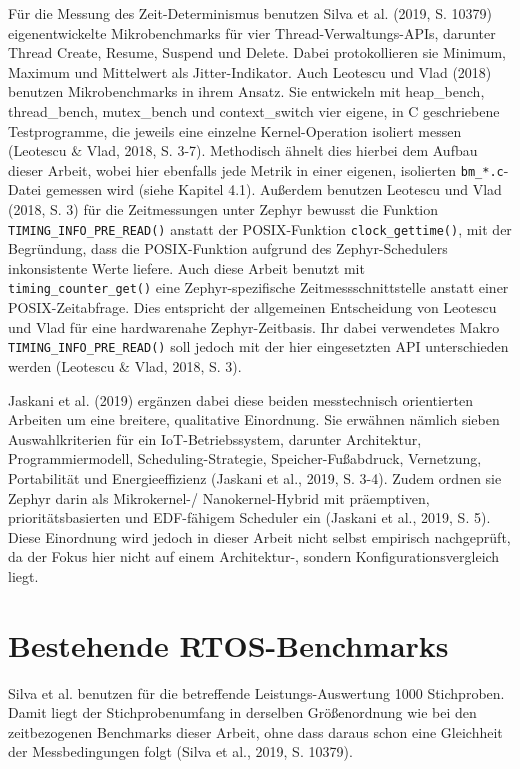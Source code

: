 F{\"u}r die Messung des Zeit-Determinismus benutzen Silva et al. (2019, S. 10379) eigenentwickelte Mikrobenchmarks f{\"u}r vier Thread-Verwaltungs-APIs, darunter \glqq{}Thread Create\grqq{}, \glqq{}Resume\grqq{}, \glqq{}Suspend\grqq{} und \glqq{}Delete\grqq{}. Dabei protokollieren sie Minimum, Maximum und Mittelwert als Jitter-Indikator. Auch Leotescu und Vlad (2018) benutzen Mikrobenchmarks in ihrem Ansatz. Sie entwickeln mit \glqq{}heap\_bench\grqq{}, \glqq{}thread\_bench\grqq{}, \glqq{}mutex\_bench\grqq{} und \glqq{}context\_switch\grqq{} vier eigene, in C geschriebene Testprogramme, die jeweils eine einzelne Kernel-Operation isoliert messen (Leotescu \& Vlad, 2018, S. 3-7). Methodisch {\"a}hnelt dies hierbei dem Aufbau dieser Arbeit, wobei hier ebenfalls jede Metrik in einer eigenen, isolierten \lstinline[style=fileinline]|bm_*.c|-Datei gemessen wird (siehe Kapitel 4.1). Au{\ss}erdem benutzen Leotescu und Vlad (2018, S. 3) f{\"u}r die Zeitmessungen unter Zephyr bewusst die Funktion \lstinline[style=fileinline]|TIMING_INFO_PRE_READ()| anstatt der POSIX-Funktion \lstinline[style=fileinline]|clock_gettime()|, mit der Begr{\"u}ndung, dass die POSIX-Funktion aufgrund des Zephyr-Schedulers inkonsistente Werte liefere. Auch diese Arbeit benutzt mit \lstinline[style=fileinline]|timing_counter_get()| eine Zephyr-spezifische Zeitmessschnittstelle anstatt einer POSIX-Zeitabfrage. Dies entspricht der allgemeinen Entscheidung von Leotescu und Vlad f{\"u}r eine hardwarenahe Zephyr-Zeitbasis. Ihr dabei verwendetes Makro \lstinline[style=fileinline]|TIMING_INFO_PRE_READ()| soll jedoch mit der hier eingesetzten API unterschieden werden (Leotescu \& Vlad, 2018, S. 3).

Jaskani et al. (2019) erg{\"a}nzen dabei diese beiden messtechnisch orientierten Arbeiten um eine breitere, qualitative Einordnung. Sie erw{\"a}hnen n{\"a}mlich sieben Auswahlkriterien f{\"u}r ein IoT-Betriebssystem, darunter Architektur, Programmiermodell, Scheduling-Strategie, Speicher-Fu{\ss}abdruck, Vernetzung, Portabilit{\"a}t und Energieeffizienz (Jaskani et al., 2019, S. 3-4). Zudem ordnen sie Zephyr darin als Mikrokernel-/ Nanokernel-Hybrid mit pr{\"a}emptiven, priorit{\"a}tsbasierten und EDF-f{\"a}higem Scheduler ein (Jaskani et al., 2019, S. 5). Diese Einordnung wird jedoch in dieser Arbeit nicht selbst empirisch nachgepr{\"u}ft, da der Fokus hier nicht auf einem Architektur-, sondern Konfigurationsvergleich liegt.

\section{Bestehende RTOS-Benchmarks}
Silva et al. benutzen f{\"u}r die betreffende Leistungs-Auswertung 1000 Stichproben. Damit liegt der Stichprobenumfang in derselben Gr{\"o}{\ss}enordnung wie bei den zeitbezogenen Benchmarks dieser Arbeit, ohne dass daraus schon eine Gleichheit der Messbedingungen folgt (Silva et al., 2019, S. 10379).

